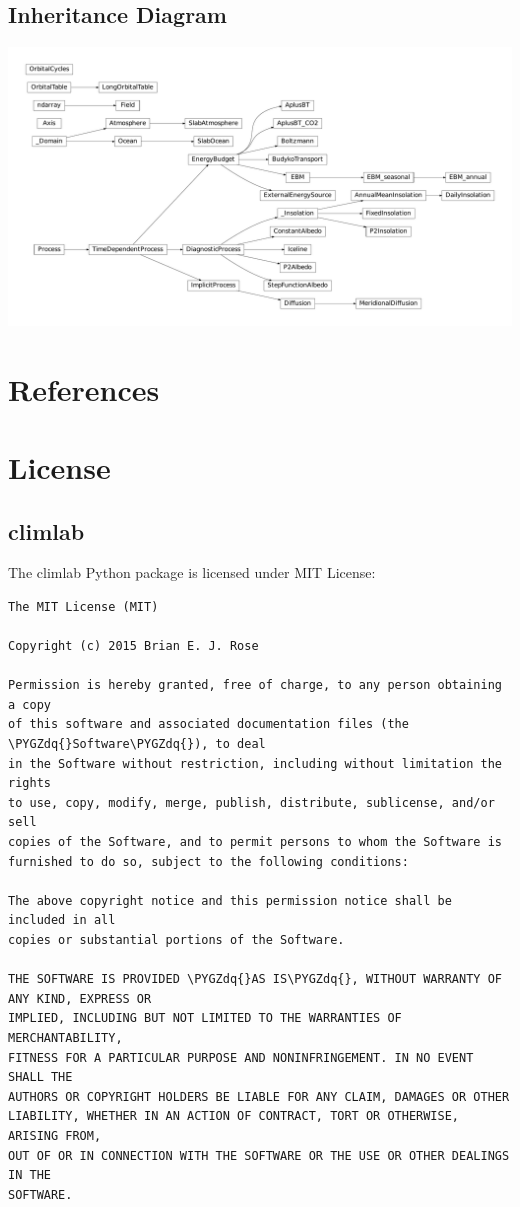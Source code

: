 \documentclass[a4paper,10pt,english]{sphinxmanual}
\def\PYGZdq{\char`\"}
\begin{document}
\section{Inheritance Diagram}
\label{api/climlab:inheritance-diagram}
\includegraphics{inheritance-2e945ea83a47159854e1f75793c2cb4dcad43828.pdf}


\chapter{References}
\label{references:references}\label{references::doc}

\chapter{License}
\label{license::doc}\label{license:license}

\section{climlab}
\label{license:climlab}
The climlab Python package is licensed under MIT License:

\begin{Verbatim}[commandchars=\\\{\}]
The MIT License (MIT)

Copyright (c) 2015 Brian E. J. Rose

Permission is hereby granted, free of charge, to any person obtaining a copy
of this software and associated documentation files (the \PYGZdq{}Software\PYGZdq{}), to deal
in the Software without restriction, including without limitation the rights
to use, copy, modify, merge, publish, distribute, sublicense, and/or sell
copies of the Software, and to permit persons to whom the Software is
furnished to do so, subject to the following conditions:

The above copyright notice and this permission notice shall be included in all
copies or substantial portions of the Software.

THE SOFTWARE IS PROVIDED \PYGZdq{}AS IS\PYGZdq{}, WITHOUT WARRANTY OF ANY KIND, EXPRESS OR
IMPLIED, INCLUDING BUT NOT LIMITED TO THE WARRANTIES OF MERCHANTABILITY,
FITNESS FOR A PARTICULAR PURPOSE AND NONINFRINGEMENT. IN NO EVENT SHALL THE
AUTHORS OR COPYRIGHT HOLDERS BE LIABLE FOR ANY CLAIM, DAMAGES OR OTHER
LIABILITY, WHETHER IN AN ACTION OF CONTRACT, TORT OR OTHERWISE, ARISING FROM,
OUT OF OR IN CONNECTION WITH THE SOFTWARE OR THE USE OR OTHER DEALINGS IN THE
SOFTWARE.
\end{Verbatim}
\end{document}
